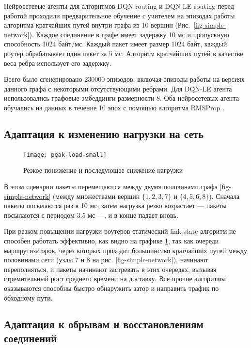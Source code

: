 \documentclass[specification,annotation,times]{itmo-student-thesis}
\theoremstyle{definition}
\begin{document}
Нейросетевые агенты для алгоритмов DQN-routing и DQN-LE-routing перед работой
проходили предварительное обучение с учителем на эпизодах работы алгоритма
кратчайших путей внутри графа из 10 вершин (Рис.~\ref{fig-simple-network}).
Каждое соединение в графе имеет задержку 10 мс и пропускную способность 1024 байт/мс.
Каждый пакет имеет размер 1024 байт, каждый роутер обрабатывает один пакет за 5
мс. Алгоритм кратчайших путей в качестве веса ребра использует его задержку.

Всего было сгенерировано 230000 эпизодов, включая эпизоды работы на версиях
данного графа с некоторыми отсутствующими ребрами. Для DQN-LE агента
использовались графовые эмбеддинги размерности 8. Оба нейросетевых агента
обучались на данных в течение 10 эпох с помощью алгоритма RMSProp \cite{tieleman2012lecture}.

\subsection{Адаптация к изменению нагрузки на сеть}

\begin{figure}[!h]
  \caption{Резкое понижение и последующее снижение нагрузки}\label{experiments:network:peak-load-small}
  \centering
  \texttt{[image: peak-load-small]}
\end{figure}

В этом сценарии пакеты перемещаются между двумя половинами
графа \ref{fig-simple-network} (между множествами вершин $\{1, 2, 3, 7\}$ и
$\{4, 5, 6, 8\}$). Сначала пакеты посылаются раз в 10 мс, затем нагрузка резко
возрастает --- пакеты посылаются с периодом 3.5 мс ---, и в конце падает вновь.

При резком повыщении нагрузки роутеров статический link-state алгоритм не
способен работать эффективно, как видно на графике
\ref{experiments:network:peak-load-small}, так как очереди маршрутизаторов,
через которых проходит большинство кратчайших путей между половинами сети
(узлы 7 и 8 на рис. \ref{fig-simple-network}), начинают переполняться, и
пакеты начинают застревать в этих очередях, вызывая стремительный рост среднего
времени на доставку. Все прочие алгоритмы оказываются способны быстро обнаружить
затор и направить трафик по обходному пути.

\subsection{Адаптация к обрывам и восстановлениям соединений}\label{experiments:simple/links}
\end{document}
